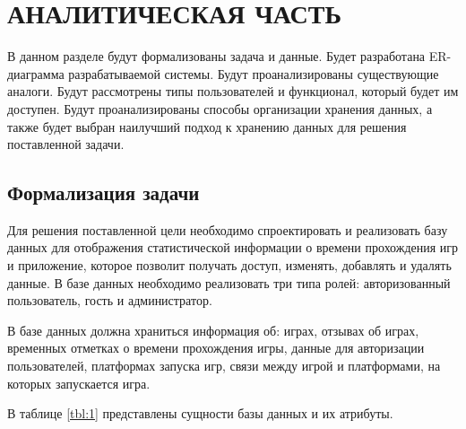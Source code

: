 \chapter{АНАЛИТИЧЕСКАЯ ЧАСТЬ}

В данном разделе будут формализованы задача и данные. Будет разработана ER-диаграмма разрабатываемой системы. Будут проанализированы существующие аналоги. Будут рассмотрены типы пользователей и функционал, который будет им доступен. Будут проанализированы способы организации хранения данных, а также будет выбран наилучший подход к хранению данных для решения поставленной задачи. 

\section{Формализация задачи}\label{data}

Для решения поставленной цели необходимо спроектировать и реализовать базу данных для отображения статистической информации о времени прохождения игр и приложение, которое позволит получать доступ, изменять, добавлять и удалять данные. В базе данных необходимо реализовать три типа ролей: авторизованный пользователь, гость и администратор. 

В базе данных должна храниться информация об: играх, отзывах об играх,
временных отметках о времени прохождения игры, данные для авторизации пользователей, платформах запуска игр, связи между игрой и платформами, на которых запускается игра. 

В таблице \ref{tbl:1} представлены сущности базы данных и их атрибуты.

